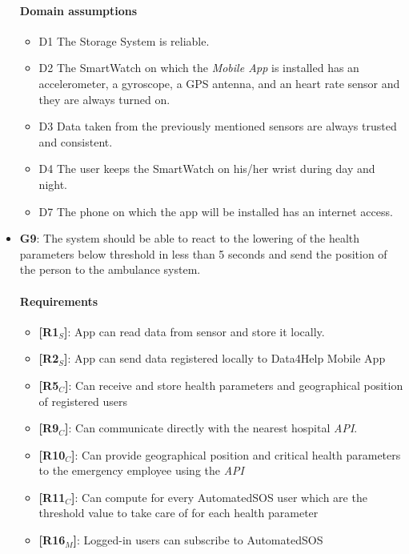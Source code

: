 \begin{itemize}
   \paragraph{Domain assumptions}
   \begin{itemize}
    \item  D1  The Storage System is reliable.
    
    \item  D2  The SmartWatch on which the \textit{Mobile App} is installed has an accelerometer, a gyroscope, a GPS antenna, and an heart rate sensor and they are always turned on.
    
    \item  D3  Data taken from the previously mentioned sensors are always trusted and consistent.
            
    \item  D4  The user keeps the SmartWatch on his/her wrist during day and night.
    
     \item  D7  The phone on which the app will be installed has an internet access.
 
   \end{itemize}
   
   
    \item \textbf{G9}: The system should be able to react to the lowering of the health parameters below threshold in less than 5 seconds and send the position of the person to the ambulance system. 
    \paragraph{Requirements}
   \begin{itemize}
    \item \textbf{[R1$_S$]}: App can read data from sensor and store it locally.
    \item \textbf{[R2$_S$]}: App can send data registered locally to Data4Help Mobile App

    \item \textbf{[R5$_C$]}: Can receive and store health parameters and geographical position of registered users

    \item \textbf{[R9$_C$]}: Can communicate directly with the nearest hospital \textit{API}.
    \item \textbf{[R10$_C$]}: Can provide geographical position and critical health parameters to the emergency employee using the \textit{API}
    \item \textbf{[R11$_C$]}: Can compute for every AutomatedSOS user which are the threshold value to take care of for each health parameter
    \item \textbf{[R16$_M$]}: Logged-in users can subscribe to AutomatedSOS


\end{itemize}
\end{itemize}
